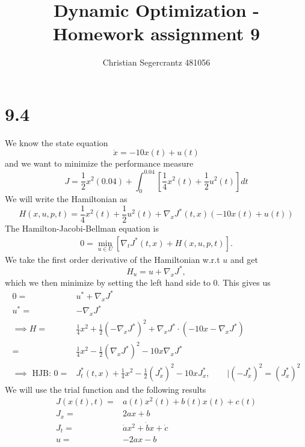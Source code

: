 \documentclass{article}
\title{Dynamic Optimization - Homework assignment 9}
\author{Christian Segercrantz 481056}
\begin{document}
	\maketitle
	\pagebreak

\section*{9.4}

We know the state equation 
\begin{equation}
	\dot{x} = -10x(t) + u(t)
\end{equation}
and we want to minimize the performance measure
\begin{equation}
	J= \frac{1}{2}x^2(0.04) + \int_{0}^{0.04} \left[ \frac{1}{4}x^2(t) + \frac{1}{2}u^2(t) \right]  dt
\end{equation}
We will write the Hamiltonian as
\begin{equation}
	H(x,u,p,t) = \frac{1}{4}x^2(t) + \frac{1}{2}u^2(t) + \nabla_x J^* (t,x)(-10x(t) + u(t))
\end{equation}
The Hamilton-Jacobi-Bellman equation is
\begin{align}
	0 = \min_{u\in U}\left[ \nabla_t J^*(t,x) + H(x,u,p,t)\right].
\end{align}
We take the first order derivative of the Hamiltonian w.r.t $u$ and get
\begin{equation}
	H_u = u+\nabla_xJ^*,
\end{equation}
which we then minimize by setting the left hand side to 0. This gives us
\begin{align}
	0 =&  u^*+\nabla_xJ^* \\
	u^* =& - \nabla_xJ^* \\
	\implies H =&  \frac{1}{4}x^2 + \frac{1}{2}(- \nabla_xJ^*)^2 + \nabla_x J^*\cdot(-10x  - \nabla_xJ^*) \\
	=& \frac{1}{4}x^2 - \frac{1}{2}(\nabla_xJ^*)^2 -10x\nabla_x J^* \\
	\implies \text{ HJB: } 0 =& J_t^*(t,x) + \frac{1}{4}x^2 - \frac{1}{2}(J_x^*)^2 -10x J_x^*, \qquad | (-J_x^*)^2 = (J_x^*)^2
\end{align}
We will use the trial function and the following results
\begin{align}
	J(x(t),t) =& a(t)x^2(t) + b(t)x(t) + c(t) \\
	J_x =& 2ax + b \\
	J_t =& \dot{a}x^2 + \dot{b}x + \dot{c} \\
	u =& -2ax - b
\end{align}
\end{document}
